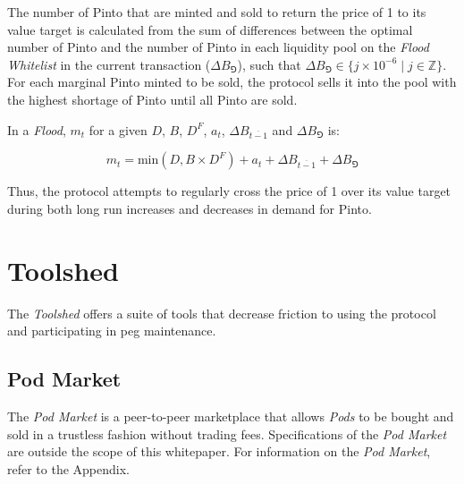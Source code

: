 \documentclass[tikz]{article}
\newcommand{\term}[1]{\textsl{#1}}
\newcommand{\Pinto}{} %
\begin{document}
The number of Pinto that are minted and sold to return the price of \Pinto1 to its value target is calculated from the sum of differences between the optimal number of Pinto and the number of Pinto in each liquidity pool on the \term{Flood Whitelist} in the current transaction ($\Delta B_{\Game}$), such that $\Delta B_{\Game} \in \{j \times 10^{-6} \mid j \in \mathbb{Z} \}$. For each marginal Pinto minted to be sold, the protocol sells it into the pool with the highest shortage of Pinto until all Pinto are sold.

\vspace{-0.05cm}

In a \term{Flood}, $m_{t}$ for a given $D$, $B$, $D^{F}$, $a_{t}$, $\Delta B_{\overline{t-1}}$ and $\Delta B_{\Game}$ is:

\vspace{-0.05cm}

    $$
        m_{t} = 
            \text{min}(D, B \times D^{F}) + 
            a_{t} + 
            \Delta B_{\overline{t-1}} + 
            \Delta B_{\Game}
    $$

\vspace{-0.05cm}

Thus, the protocol attempts to regularly cross the price of \Pinto1 over its value target during both long run increases and decreases in demand for Pinto.


\section{Toolshed}
\vspace{0.1cm}

The \term{Toolshed} offers a suite of tools that decrease friction to using the protocol and participating in peg maintenance.


\vspace{0.1cm}
\subsection{Pod Market}
\vspace{0.1cm}

The \term{Pod Market} is a peer-to-peer marketplace that allows \term{Pods} to be bought and sold in a trustless fashion without trading fees. Specifications of the \term{Pod Market} are outside the scope of this whitepaper. For information on the \term{Pod Market}, refer to the Appendix.
\end{document}
